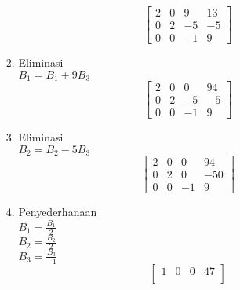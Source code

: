 \documentclass[xcolor=table]{uofa-eng-assignment}
\begin{document}
\begin{enumerate}
\begin{enumerate}
\begin{enumerate}
\begin{equation}
                                  \begin{bmatrix}
                                      2 & 0 & 9  & 13 \\
                                      0 & 2 & -5 & -5 \\
                                      0 & 0 & -1 & 9
                                  \end{bmatrix}
                              \end{equation}
                        \item Eliminasi \\
                              $B_1 = B_1 + 9B_3$
                              \begin{equation}
                                  \begin{bmatrix}
                                      2 & 0 & 0  & 94 \\
                                      0 & 2 & -5 & -5 \\
                                      0 & 0 & -1 & 9
                                  \end{bmatrix}
                              \end{equation}
                        \item Eliminasi \\
                              $B_2 = B_2 - 5B_3$
                              \begin{equation}
                                  \begin{bmatrix}
                                      2 & 0 & 0  & 94  \\
                                      0 & 2 & 0  & -50 \\
                                      0 & 0 & -1 & 9
                                  \end{bmatrix}
                              \end{equation}
                        \item Penyederhanaan \\
                              $B_1 = \frac{B_1}{2}$ \\
                              $B_2 = \frac{B_2}{2}$ \\
                              $B_3 = \frac{B_3}{-1}$
                              \begin{equation}
                                  \begin{bmatrix}
                                      1 & 0 & 0 & 47  \\

\end{bmatrix}
\end{equation}
\end{enumerate}
\end{enumerate}
\end{enumerate}
\end{document}
